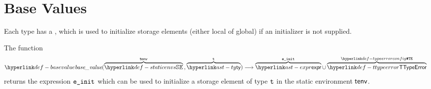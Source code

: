 \section{Base Values\label{sec:BaseValues}}

\hypertarget{def-basevalueterm}{}
Each type has a \basevalueterm, which is used to initialize storage elements (either local of global)
if an initializer is not supplied.

\hypertarget{def-basevalue}{}
The function
\[
\basevalue(\overname{\staticenvs}{\tenv} \aslsep \overname{\ty}{\vt}) \aslto
\overname{\expr}{\veinit} \cup \overname{\TTypeError}{\TypeErrorConfig}
\]
returns the expression $\texttt{e\_init}$ which can be used to initialize a storage element
of type $\texttt{t}$ in the static environment $\textsf{tenv}$.
\ProseOtherwiseTypeError

